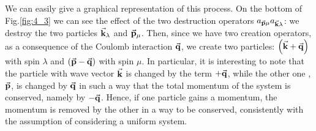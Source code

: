 \documentclass[../main/main.tex]{subfiles}
\begin{document}
\begin{itemize}
We can easily give a graphical representation of this process.
On the bottom of Fig.\ref{fig:4_3} we can see the effect of the two destruction operators \(  a_{\va{p}\mu } a_{\va{k}\lambda } \): we destroy the two particles \( \va{k}_ \lambda  \) and \( \va{p}_ \mu  \).
Then, since we have two creation operators, as  a consequence of the Coulomb interaction \( \va{q} \), we create two particles:  \( \qty(\va{k}+\va{q})  \) with spin \( \lambda  \)  and \( \qty(\va{p}-\va{q})  \) with spin \( \mu  \). In particular, it is interesting to note that the particle with wave vector \( \va{k} \) is changed by the term \( + \va{q} \),
while the other one ,\( \va{p} \), is changed by \( \va{q} \) in such a way that the total  momentum of the system is conserved, namely by \(- \va{q} \). Hence, if one particle gains a momentum, the momentum is removed by the other in a way to be conserved, consistently with the assumption of considering a uniform system.

\end{itemize}
\end{document}
